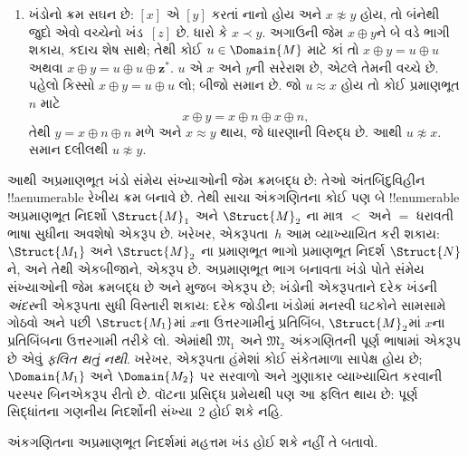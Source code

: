 \documentclass[../../../include/open-logic-section]{subfiles}
\begin{document}
\begin{enumerate}
\item ખંડોનો ક્રમ
  સઘન છે: $[x]$
  એ $[y]$ કરતાં
  નાનો હોય અને
  $x \not\approx y$
  હોય, તો બંનેથી
  જુદો એવો વચ્ચેનો
  ખંડ~$[z]$ છે.
  ધારો કે $x \prec
  y$. અગાઉની જેમ
  $x \oplus y$ને
  બે વડે ભાગી
  શકાય, કદાચ
  શેષ સાથે;
  તેથી કોઈ $u
  \in \Domain{M}$
  માટે કાં તો
  $x \oplus y =
  u \oplus u$
  અથવા $x \oplus
  y = u \oplus u
  \oplus \mathbf{z}^*$.
  $u$ એ $x$
  અને $y$ની
  સરેરાશ છે,
  એટલે તેમની
  વચ્ચે છે. પહેલો
  કિસ્સો $x \oplus
  y = u \oplus u$
  લો; બીજો
  સમાન છે. જો
  $u \approx x$
  હોય તો કોઈ
  પ્રમાણભૂત $n$
  માટે
  \[
  x \oplus y = x \oplus n \oplus x \oplus n,
  \]
  તેથી $y = x
  \oplus n \oplus n$
  મળે અને
  $x \approx y$
  થાય, જે
  ધારણાની વિરુદ્ધ
  છે. આથી
  $u \not\approx x$.
  સમાન દલીલથી
  $u \not\approx y$.
\end{enumerate}
આથી અપ્રમાણભૂત
ખંડો સંમેય
સંખ્યાઓની જેમ
ક્રમબદ્ધ છે:
તેઓ અંતબિંદુવિહીન
!!a{enumerable}
રેખીય ક્રમ બનાવે
છે. તેથી સાચા
અંકગણિતના
કોઈ પણ બે
!!{enumerable}
અપ્રમાણભૂત
નિદર્શો
$\Struct{M}_1$
અને $\Struct{M}_2$
ના માત્ર $<$
અને $=$ ધરાવતી
ભાષા સુધીના
અવશેષો એકરૂપ
છે. ખરેખર,
એકરૂપતા~$h$
આમ વ્યાખ્યાયિત
કરી શકાય:
$\Struct{M_1}$
અને $\Struct{M}_2$
ના પ્રમાણભૂત
ભાગો પ્રમાણભૂત
નિદર્શ
$\Struct{N}$ને,
અને તેથી
એકબીજાને,
એકરૂપ છે.
અપ્રમાણભૂત
ભાગ બનાવતા
ખંડો પોતે
સંમેય સંખ્યાઓની
જેમ ક્રમબદ્ધ
છે અને
મુજબ એકરૂપ
છે; ખંડોની
એકરૂપતાને
દરેક ખંડની
\emph{અંદર}ની
એકરૂપતા સુધી
વિસ્તારી શકાય:
દરેક જોડીના
ખંડોમાં મનસ્વી
ઘટકોને સામસામે
ગોઠવો અને પછી
$\Struct{M_1}$માં
$x$ના ઉત્તરગામીનું
પ્રતિબિંબ,
$\Struct{M}_2$માં
$x$ના પ્રતિબિંબના
ઉત્તરગામી તરીકે
લો. એમાંથી
$\mathfrak{M}_1$
અને $\mathfrak{M}_2$
અંકગણિતની પૂર્ણ
ભાષામાં એકરૂપ
છે એવું
\emph{ફલિત થતું નથી}.
ખરેખર, એકરૂપતા
હંમેશાં કોઈ
સંકેતમાળા સાપેક્ષ
હોય છે; $\Domain{M_1}$
અને $\Domain{M_2}$
પર સરવાળો અને
ગુણાકાર વ્યાખ્યાયિત
કરવાની પરસ્પર
બિનએકરૂપ રીતો
છે. વૉટના
પ્રસિદ્ધ પ્રમેયથી
પણ આ ફલિત
થાય છે: પૂર્ણ
સિદ્ધાંતના
ગણનીય નિદર્શોની
સંખ્યા~2
હોઈ શકે નહિ.


\begin{prob}
અંકગણિતના અપ્રમાણભૂત નિદર્શમાં
મહત્તમ ખંડ હોઈ શકે નહીં તે બતાવો.
\end{prob}
\end{document}
